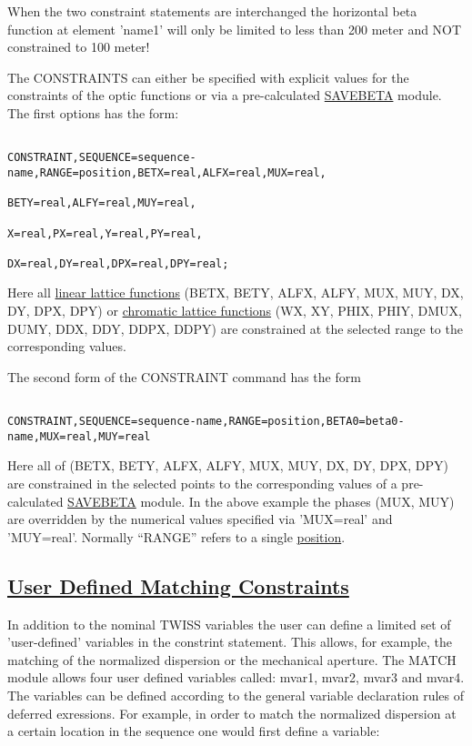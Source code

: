 When the two constraint statements are interchanged the 
horizontal beta function at element 'name1' will only be limited to less than
200 meter and NOT constrained to 100 meter!




The CONSTRAINTS can
either be specified with explicit values for the constraints of
the optic functions or via a pre-calculated 
\href{../control/general.html#savebeta}{SAVEBETA} module.
The first options has the form:

\begin{verbatim}

CONSTRAINT,SEQUENCE=sequence-name,RANGE=position,BETX=real,ALFX=real,MUX=real,
                                                 BETY=real,ALFY=real,MUY=real,
                                                 X=real,PX=real,Y=real,PY=real,
                                                 DX=real,DY=real,DPX=real,DPY=real;

\end{verbatim}
Here all \href{../Introduction/tables.html#linear}{linear lattice functions}
(BETX, BETY, ALFX, ALFY, MUX, MUY, DX, DY, DPX, DPY)
or \href{../Introduction/tables.html#chrom}{chromatic lattice functions}
(WX, XY, PHIX, PHIY, DMUX, DUMY, DDX, DDY, DDPX, DDPY)
are constrained at the selected range to the corresponding values.



The second form of the CONSTRAINT command has the form

\begin{verbatim}

CONSTRAINT,SEQUENCE=sequence-name,RANGE=position,BETA0=beta0-name,MUX=real,MUY=real
\end{verbatim}
Here all of (BETX, BETY, ALFX, ALFY, MUX, MUY, DX, DY, DPX, DPY)
are constrained in the selected points to the corresponding values
of a pre-calculated \href{../control/general.html#savebeta}{SAVEBETA} module.
In the above example
the phases (MUX, MUY) are overridden by the numerical values specified via
'MUX=real' and 'MUY=real'.
Normally ``RANGE'' refers to a single
\href{../Introduction/ranges.html#position}{position}.




\subsection{\href{user-var}{User Defined Matching Constraints}}
In addition to the nominal TWISS variables the user can define a limited set of 'user-defined' variables in the constrint statement. This allows, for example, the matching of the normalized dispersion or the mechanical aperture. The MATCH module allows four user defined variables called: mvar1, mvar2, mvar3 and mvar4. The variables can be defined according to the general variable declaration rules of deferred exressions. For example, in order to match the normalized dispersion at a certain location in the sequence one would first define a variable: 



